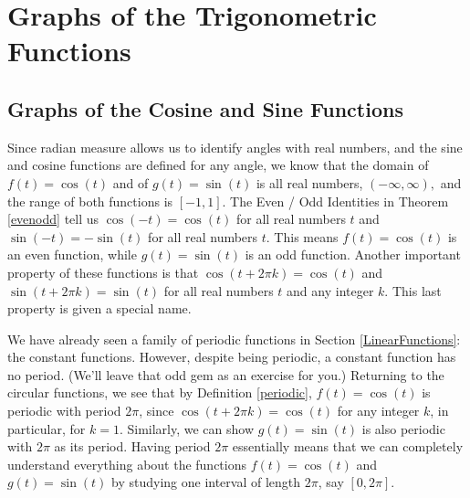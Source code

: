\section{Graphs of the Trigonometric Functions}

\label{TrigGraphs}


\subsection{Graphs of the Cosine and Sine Functions}

Since radian measure allows us to identify angles with real numbers, and the sine and cosine functions are defined for any angle, we know that the domain of $f(t) = \cos(t)$ and of $g(t) = \sin(t)$ is all real numbers, $(-\infty, \infty),$ and the range of both functions is $[-1,1]$.  The Even / Odd Identities in Theorem \ref{evenodd} tell us $\cos(-t) = \cos(t)$ for all real numbers $t$ and $\sin(-t) = -\sin(t)$ for all real numbers $t$.  This means $f(t) = \cos(t)$ is an even function, while $g(t) = \sin(t)$ is an odd function.  Another important property of these  functions is that $\cos(t + 2\pi k) = \cos(t)$ and $\sin(t + 2\pi k) = \sin(t)$ for all real numbers $t$ and any integer $k$.  This last property is given a special name.

\smallskip


\medskip

We have already seen a family of periodic functions in Section \ref{LinearFunctions}:  the constant functions.  However, despite being periodic, a constant function has no period.  (We'll leave that odd gem as an exercise for you.)  Returning to the circular functions, we see that by Definition \ref{periodic}, $f(t) = \cos(t)$ is periodic with period $2\pi$, since $\cos(t + 2\pi k) = \cos(t)$ for any integer $k$, in particular, for $k=1$.
 Similarly, we can show $g(t) = \sin(t)$ is also periodic with $2\pi$ as its period.   Having period $2\pi$ essentially means that we can completely understand everything about the functions  $f(t) = \cos(t)$ and $g(t) = \sin(t)$ by studying one interval of length $2\pi$, say $[0,2\pi]$.

